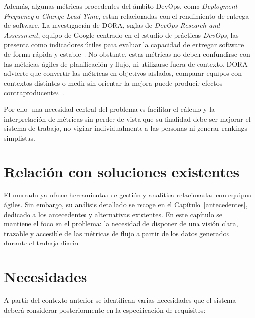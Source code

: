 Además, algunas métricas procedentes del ámbito DevOps, como \textit{Deployment Frequency} o \textit{Change Lead Time}, están relacionadas con el rendimiento de entrega de software. La investigación de DORA, siglas de \textit{DevOps Research and Assessment}, equipo de Google centrado en el estudio de prácticas \textit{DevOps}, las presenta como indicadores útiles para evaluar la capacidad de entregar software de forma rápida y estable~\cite{DORAMetrics}. No obstante, estas métricas no deben confundirse con las métricas ágiles de planificación y flujo, ni utilizarse fuera de contexto. DORA advierte que convertir las métricas en objetivos aislados, comparar equipos con contextos distintos o medir sin orientar la mejora puede producir efectos contraproducentes~\cite{DORAMetrics}.

Por ello, una necesidad central del problema es facilitar el cálculo y la interpretación de métricas sin perder de vista que su finalidad debe ser mejorar el sistema de trabajo, no vigilar individualmente a las personas ni generar rankings simplistas.

\section{Relación con soluciones existentes}

El mercado ya ofrece herramientas de gestión y analítica relacionadas con equipos ágiles. Sin embargo, su análisis detallado se recoge en el Capítulo~\ref{antecedentes}, dedicado a los antecedentes y alternativas existentes. En este capítulo se mantiene el foco en el problema: la necesidad de disponer de una visión clara, trazable y accesible de las métricas de flujo a partir de los datos generados durante el trabajo diario.

\section{Necesidades}

A partir del contexto anterior se identifican varias necesidades que el sistema deberá considerar posteriormente en la especificación de requisitos:

